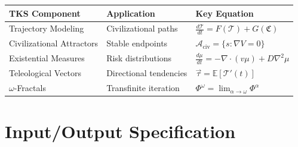 \documentclass[11pt,twoside]{book}
\renewcommand{\arraystretch}{1.2}
\newcommand{\TransFrac}[1]{\Phi^{#1}}
\newcommand{\Cultural}{\mathfrak{C}}
\newcommand{\Trajectory}{\mathcal{T}}
\begin{document}
\begin{center}
\renewcommand{\arraystretch}{1.4}
\begin{tabularx}{\textwidth}{>{\raggedright\arraybackslash}p{3cm}|>{\raggedright\arraybackslash}X|>{\raggedright\arraybackslash}p{4cm}}
\toprule
\textbf{TKS Component} & \textbf{Application} & \textbf{Key Equation} \\
\midrule
Trajectory Modeling & Civilizational paths & $\frac{d\Trajectory}{dt} = F(\Trajectory) + G(\Cultural)$ \\
Civilizational Attractors & Stable endpoints & $\mathcal{A}_{\mathrm{civ}} = \{s : \nabla V = 0\}$ \\
Existential Measures & Risk distributions & $\frac{d\mu}{dt} = -\nabla\cdot(v\mu) + D\nabla^2\mu$ \\
Teleological Vectors & Directional tendencies & $\vec{\tau} = \mathbb{E}[\Trajectory'(t)]$ \\
$\omega$-Fractals & Transfinite iteration & $\TransFrac{\omega} = \lim_{\alpha\to\omega}\TransFrac{\alpha}$ \\
\bottomrule
\end{tabularx}
\end{center}

\section{Input/Output Specification}
\end{document}
